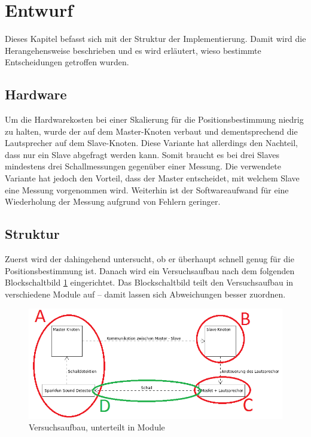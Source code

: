 \newpage
\section{Entwurf}
Dieses Kapitel befasst sich mit der Struktur der Implementierung. Damit wird die Herangehensweise beschrieben und es wird erläutert, wieso bestimmte Entscheidungen getroffen wurden.

\subsection{Hardware}
Um die Hardwarekosten bei einer Skalierung für die Positionsbestimmung niedrig zu halten, wurde der \microphone \platz auf dem Master-Knoten verbaut und dementsprechend die Lautsprecher auf dem Slave-Knoten. Diese Variante hat allerdings den Nachteil, dass nur ein Slave abgefragt werden kann. Somit braucht es bei drei Slaves mindestens drei Schallmessungen gegenüber einer Messung. Die verwendete Variante hat jedoch den Vorteil, dass der Master entscheidet, mit welchem Slave eine Messung vorgenommen wird. Weiterhin ist der Softwareaufwand für eine Wiederholung der Messung aufgrund von Fehlern geringer.

\subsection{Struktur}
Zuerst wird der \microphone \platz dahingehend untersucht, ob er überhaupt schnell genug für die Positionsbestimmung ist. Danach wird ein Versuchsaufbau nach dem folgenden Blockschaltbild \ref{img:kommunikation_module} eingerichtet. Das Blockschaltbild teilt den Versuchsaufbau in verschiedene Module auf -- damit lassen sich Abweichungen besser zuordnen.

\begin{figure}[H]
\centering
\hspace*{-2.6cm}
\includegraphics[width=1.3\textwidth]{images/Kommunikation_Module.png}
\caption{Versuchsaufbau, unterteilt in Module}
\label{img:kommunikation_module}
\end{figure}

